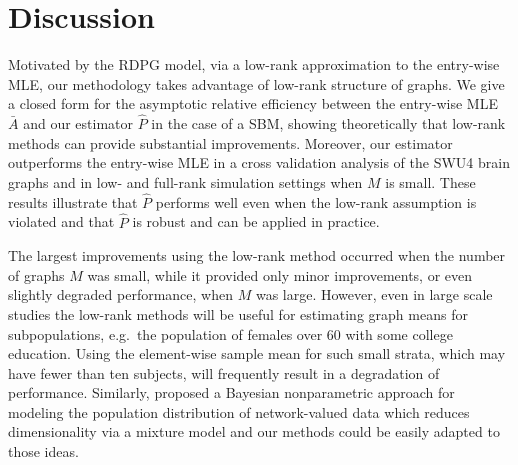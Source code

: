 \documentclass[journal,twoside,web]{ieeecolor}
\begin{document}
\section{Discussion}\label{sec:discussion}

Motivated by the RDPG model, via a low-rank approximation to the entry-wise MLE, our methodology takes advantage of low-rank structure of graphs.
We give a closed form for the asymptotic relative efficiency between the entry-wise MLE $\bar{A}$ and our estimator $\hat{P}$ in the case of a SBM, showing theoretically that low-rank methods can provide substantial improvements.
Moreover, our estimator outperforms the entry-wise MLE in a cross validation analysis of the SWU4 brain graphs and in low- and full-rank simulation settings when $M$ is small.
These results illustrate that $\hat{P}$ performs well even when the low-rank assumption is violated and that $\hat{P}$ is robust and can be applied in practice.

The largest improvements using the low-rank method occurred when the number of graphs $M$ was small, while it provided only minor improvements, or even slightly degraded performance, when $M$ was large.
However, even in large scale studies the low-rank methods will be useful for estimating graph means for subpopulations, e.g.\ the population of females over 60 with some college education.
Using the element-wise sample mean for such small strata, which may have fewer than ten subjects, will frequently result in a degradation of performance.
Similarly, \cite{durante2016nonparametric} proposed a Bayesian nonparametric approach for modeling the population distribution of network-valued data which reduces dimensionality via a mixture model and our methods could be easily adapted to those ideas.


\end{document}
